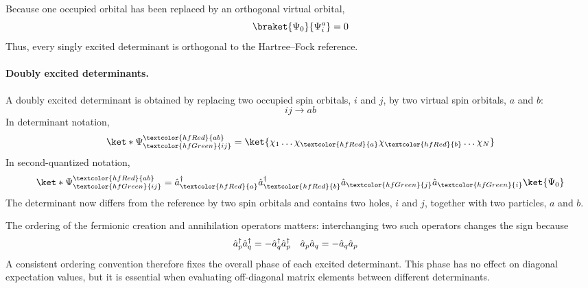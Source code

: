 \documentclass[11pt,a4paper,titlepage]{article}
\numberwithin{equation}{section}
\newcommand{\red}[1]{\textcolor{hfRed}{#1}}
\newcommand{\green}[1]{\textcolor{hfGreen}{#1}}
\newcommand{\cre}[1]{\Hat{a}_{#1}^\dag}
\newcommand{\ani}[1]{\Hat{a}_{#1}}
\begin{document}
Because one occupied orbital has been replaced by an orthogonal virtual
orbital,
\begin{equation}
  \braket{\Psi_0}{\Psi_i^a}=0
\end{equation}
Thus, every singly excited determinant is orthogonal to the Hartree--Fock reference.


\paragraph{Doubly excited determinants.}

A doubly excited determinant is obtained by replacing two occupied
spin orbitals, $i$ and $j$, by two virtual spin orbitals, $a$ and $b$:
\begin{equation}
  ij\longrightarrow ab
\end{equation}
In determinant notation,
\begin{equation}
  \ket*{\Psi_{\green{ij}}^{\red{ab}}}
  =
  \ket{
    \chi_1
    \ldots
    \chi_{\red{a}}
    \chi_{\red{b}}
    \ldots
    \chi_N
  }
\end{equation}
In second-quantized notation,
\begin{equation}
  \ket*{\Psi_{\green{ij}}^{\red{ab}}}
  =
  \cre{\red{a}}
  \cre{\red{b}}
  \ani{\green{j}}
  \ani{\green{i}}
  \ket{\Psi_0}
  \label{eq:double-excited-determinant}
\end{equation}
The determinant now differs from the reference by two spin orbitals and
contains two holes, $i$ and $j$, together with two particles, $a$ and $b$.

The ordering of the fermionic creation and annihilation operators matters:
interchanging two such operators changes the sign because
\begin{align}
  \cre{p}\cre{q}
  &=
  -\cre{q}\cre{p}
  &
  \ani{p}\ani{q}
  &=
  -\ani{q}\ani{p}
\end{align}
A consistent ordering convention therefore fixes the overall phase of each
excited determinant. This phase has no effect on diagonal expectation
values, but it is essential when evaluating off-diagonal matrix elements
between different determinants.
\end{document}
